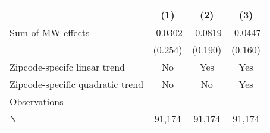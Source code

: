 {
\def\sym#1{\ifmmode^{#1}\else\(^{#1}\)\fi}
\begin{tabular}{l*{3}{c}}
\hline\hline
          &\multicolumn{1}{c}{(1)}         &\multicolumn{1}{c}{(2)}         &\multicolumn{1}{c}{(3)}         \\
\hline
Sum of MW effects&  -0.0302         &  -0.0819         &  -0.0447         \\
          &  (0.254)         &  (0.190)         &  (0.160)         \\
\hline
Zipcode-specifc linear trend&       No         &      Yes         &      Yes         \\
Zipcode-specific quadratic trend&       No         &       No         &      Yes         \\
Observations&                  &                  &                  \\
N         &   91,174         &   91,174         &   91,174         \\
\hline\hline
\end{tabular}
}
